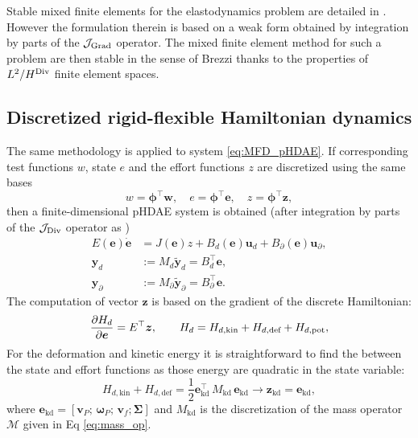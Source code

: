 \begin{remark}
Stable mixed finite elements for the elastodynamics problem are detailed in \cite{ArnoldElasDyn}. However the formulation therein is based on a weak form obtained by integration by parts of the $\mathcal{J}_{\operatorname*{Grad}}$ operator. The mixed finite element method for such a problem are then stable in the sense of Brezzi thanks to the properties of $L^2 / H^{\operatorname*{Div}}$ finite element spaces.
\end{remark}

\subsection{Discretized rigid-flexible Hamiltonian dynamics}

The same methodology is applied to system \eqref{eq:MFD_pHDAE}. If corresponding test functions $w$, state $e$ and the effort functions $z$ are discretized using the same bases
\[ w = \bm{\phi}^\top \bm{w}, \quad e = \bm{\phi}^\top \bm{e}, \quad z = \bm{\phi}^\top \bm{z},
\]
then a finite-dimensional pHDAE system is obtained (after integration by parts of the $\mathcal{J}_{\operatorname*{Div}}$ operator as )
\begin{equation}
	\begin{aligned}
	{E}(\bm{e}) \dot{\bm{e}} &= {J(\bm{e}) z} + {B}_d(\bm{e}) \bm{u}_d + {B}_\partial(\bm{e}) \bm{u}_\partial, \\
	\bm{y}_d &:= {M}_d \widetilde{\bm{y}}_d = {B}_d^\top \bm{e},  \\
	\bm{y}_\partial &:= {M}_\partial \widetilde{\bm{y}}_\partial = {B}_\partial^\top \bm{e}.
	\end{aligned}
\end{equation}
The computation of vector $\bm{z}$ is based on the gradient of the discrete Hamiltonian:
\[
\diffp{H_d}{\bm{e}} = {E}^\top \bm{z}, \qquad H_d = H_{d, \text{kin}}+H_{d, \text{def}}+H_{d, \text{pot}},
\]
For the deformation and kinetic energy it is straightforward to find the between the state and effort functions as those energy are quadratic in the state variable:
\begin{equation}
H_{d, \text{kin}} + H_{d, \text{def}} = \frac{1}{2} \bm{e}_{\text{kd}}^\top \, {M}_{\text{kd}} \, \bm{e}_{\text{kd}} \longrightarrow \bm{z}_{\text{kd}} = \bm{e}_{\text{kd}},
\end{equation}
where $\bm{e}_{\text{kd}} = [\bm{v}_P; \, \bm{\omega}_P; \, \bm{v}_f; \bm{\Sigma}]$ and ${M}_{\text{kd}}$ is the discretization of the mass operator $\mathcal{M}$ given in Eq \eqref{eq:mass_op}. 
